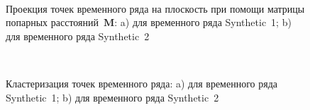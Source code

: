\documentclass[12pt, twoside]{article}
\numberwithin{equation}{section}
\begin{document}
\begin{figure}[h!t]\center
{}
\\
\caption{Проекция точек временного ряда на плоскость при помощи матрицы попарных расстояний~$\textbf{M}$: a) для временного ряда Synthetic~1; b) для временного ряда Synthetic~2}
\label{fig_synthetic_2D}
\end{figure}

\begin{figure}[h!t]\center
{}
\\
\caption{Кластеризация точек временного ряда: a) для временного ряда Synthetic~1; b) для временного ряда Synthetic~2}
\label{fig_synthetic_claster}
\end{figure}
\end{document}
